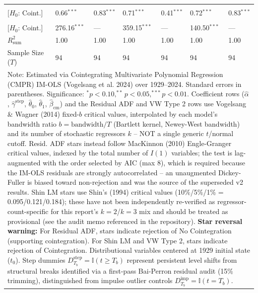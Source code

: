 \begin{table}[H]
\begin{tabular}{p{3.8cm}p{1.35cm}p{1.35cm}p{1.35cm}p{1.35cm}p{1.35cm}p{1.35cm}}
\makecell[l]{Shin LM ($C_{\text{Shin}}$) \\ {\scriptsize [$H_0$: Coint.]}} & 0.66$^{***}$ & 0.83$^{***}$ & 0.71$^{***}$ & 0.41$^{***}$ & 0.72$^{***}$ & 0.83$^{***}$  \\
\makecell[l]{VW Type 2 ($S_{\text{Type 2}}$) \\ {\scriptsize [$H_0$: Coint.]}} & 276.16$^{***}$ & --- & 359.15$^{***}$ & --- & 140.50$^{***}$ & ---  \\
\midrule
$R^2_{\text{sum}}$ & 1.00 & 1.00 & 1.00 & 1.00 & 1.00 & 1.00  \\
Sample Size ($T$) & 94 & 94 & 94 & 94 & 94 & 94  \\
\bottomrule
\multicolumn{7}{p{13.2cm}}{\footnotesize Note: Estimated via Cointegrating Multivariate Polynomial Regression (CMPR) IM-OLS (Vogelsang et al. 2024) over 1929--2024. Standard errors in parentheses. Significance: $^*p<0.10, ^{**}p<0.05, ^{***}p<0.01$. Coefficient rows ($\hat{\alpha}$, $\hat{\gamma}^{\text{step}}$, $\hat{\theta}_0$, $\hat{\theta}_1$, $\hat{\beta}_{\text{cm}}$) and the Residual ADF and VW Type 2 rows use Vogelsang \& Wagner (2014) fixed-$b$ critical values, interpolated by each model's bandwidth ratio $b=\text{bandwidth}/T$ (Bartlett kernel, Newey-West bandwidth) and its number of stochastic regressors $k$ -- NOT a single generic $t$/normal cutoff. Resid. ADF stars instead follow MacKinnon (2010) Engle-Granger critical values, indexed by the total number of $I(1)$ variables; the test is lag-augmented with the order selected by AIC (max 8), which is required because the IM-OLS residuals are strongly autocorrelated -- an unaugmented Dickey-Fuller is biased toward non-rejection and was the source of the superseded v2 results. Shin LM stars use Shin's (1994) critical values (10\%/5\%/1\% = 0.095/0.121/0.184); these have not been independently re-verified as regressor-count-specific for this report's $k=2$/$k=3$ mix and should be treated as provisional (see the audit memo referenced in the repository). \textbf{Star reversal warning:} For Residual ADF, stars indicate rejection of No Cointegration (supporting cointegration). For Shin LM and VW Type 2, stars indicate rejection of Cointegration. Distributional variables centered at 1929 initial state ($t_0$). Step dummies $D^{\text{step}}_{T_b} = \mathbb{I}(t \ge T_b)$ represent persistent level shifts from structural breaks identified via a first-pass Bai-Perron residual audit (15\% trimming), distinguished from impulse outlier controls $D^{\text{imp}}_{T_b} = \mathbb{I}(t = T_b)$.}
\end{tabular}
\end{table}
